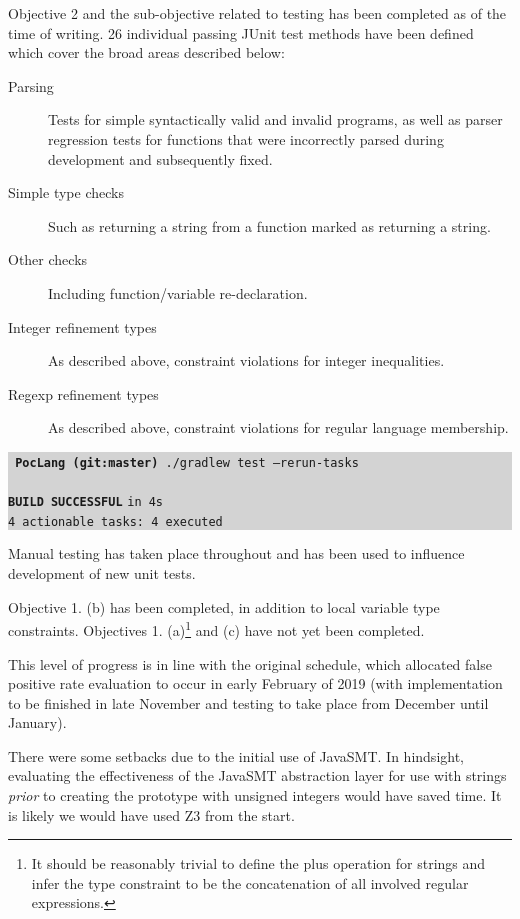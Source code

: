 \documentclass[a4paper]{article}
\newcommand{\termbox}[1] {\colorbox{lightgrey}{\parbox{\textwidth}{\vspace{.75\baselineskip}\centering\parbox{0.95\textwidth}{ \sffamily#1\vspace{.75\baselineskip}}}}}
\begin{document}
Objective 2 and the sub-objective related to testing has been completed as of the time of writing. 26 individual passing JUnit test methods have been defined which cover the broad areas described below:

\begin{description}
    \item[Parsing] Tests for simple syntactically valid and invalid programs, as well as parser regression tests for functions that were incorrectly parsed during development and subsequently fixed.
    \item[Simple type checks] Such as returning a string from a function marked as returning a string.
    \item[Other checks] Including function/variable re-declaration.
    \item[Integer refinement types] As described above, constraint violations for integer inequalities.
    \item[Regexp refinement types] As described above, constraint violations for regular language membership.
\end{description}

\termbox{
    \texttt{\textcolor{term-green}{} \ttfamily \textbf{\textcolor{term-dir}{PocLang} \textcolor{term-git}{(git:}\textcolor{term-branch}{master}\textcolor{term-git}{)}} ./gradlew test --rerun-tasks}\\\\

    \textcolor{term-green}{\textbf{\texttt{BUILD SUCCESSFUL}}} \texttt{in 4s}\\
    \texttt{4 actionable tasks: 4 executed}
}

Manual testing has taken place throughout and has been used to influence development of new unit tests.

Objective 1. (b) has been completed, in addition to local variable type constraints. Objectives 1. (a)\footnote{It should be reasonably trivial to define the plus operation for strings and infer the type constraint to be the concatenation of all involved regular expressions.} and (c) have not yet been completed.

This level of progress is in line with the original schedule, which allocated false positive rate evaluation to occur in early February of 2019 (with implementation to be finished in late November and testing to take place from December until January).

There were some setbacks due to the initial use of JavaSMT. In hindsight, evaluating the effectiveness of the JavaSMT abstraction layer for use with strings \emph{prior} to creating the prototype with unsigned integers would have saved time. It is likely we would have used Z3 from the start.
\end{document}

